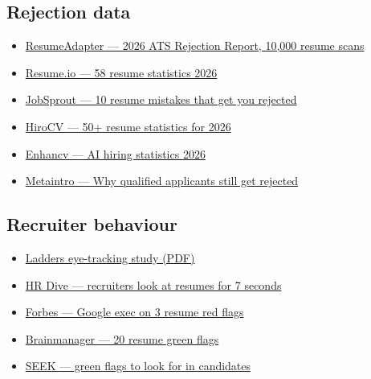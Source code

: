 \documentclass[11pt,a4paper]{article}
\begin{document}
\subsection*{Rejection data}
\begin{itemize}\setlength\itemsep{1pt}
  \item \href{https://www.resumeadapter.com/blog/2026-ats-rejection-report-10000-resume-scans}{ResumeAdapter --- 2026 ATS Rejection Report, 10,000 resume scans}
  \item \href{https://resume.io/blog/resume-statistics}{Resume.io --- 58 resume statistics 2026}
  \item \href{https://www.jobsprout.ai/blog/resume-mistakes}{JobSprout --- 10 resume mistakes that get you rejected}
  \item \href{https://hirocv.com/blog/resume-statistics-2026-data-hiring}{HiroCV --- 50+ resume statistics for 2026}
  \item \href{https://enhancv.com/blog/ai-hiring-statistics/}{Enhancv --- AI hiring statistics 2026}
  \item \href{https://www.metaintro.com/blog/real-reasons-qualified-applicants-rejected-how-to-fix}{Metaintro --- Why qualified applicants still get rejected}
\end{itemize}

\subsection*{Recruiter behaviour}
\begin{itemize}\setlength\itemsep{1pt}
  \item \href{https://www.theladders.com/static/images/basicSite/pdfs/TheLadders-EyeTracking-StudyC2.pdf}{Ladders eye-tracking study (PDF)}
  \item \href{https://www.hrdive.com/news/eye-tracking-study-shows-recruiters-look-at-resumes-for-7-seconds/541582/}{HR Dive --- recruiters look at resumes for 7 seconds}
  \item \href{https://www.forbes.com/sites/rachelwells/2026/04/06/i-spoke-to-a-google-exec-he-reveals-the-3-resume-red-flags-that-instantly-get-you-rejected/}{Forbes --- Google exec on 3 resume red flags}
  \item \href{https://brainmanager.io/blog/career/resume-green-flags}{Brainmanager --- 20 resume green flags}
  \item \href{https://talent.seek.com.au/hiring-advice/article/green-flags-to-look-for-in-candidates}{SEEK --- green flags to look for in candidates}
\end{itemize}
\end{document}
